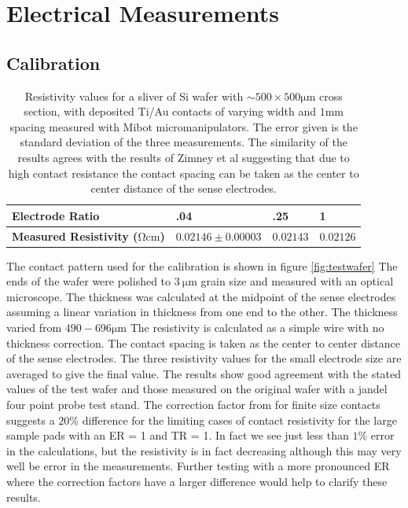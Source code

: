 \FloatBarrier


\section{Electrical Measurements}
\subsection{Calibration }

\begin{table}[!htb]
\begin{center}
\begin{tabular}{ | l | l | l | l |}
\hline
\textbf{Electrode Ratio}&\textbf{.04} & \textbf{.25} & \textbf{1} \\ \hline
\textbf{Measured Resistivity ($\si{\ohm \cm}$)} & $ 0.02146 \pm 0.00003$& $0.02143$&$0.02126 $\\\hline

\end{tabular}
\end{center}
\caption{Resistivity values for a sliver of Si wafer with $\sim 500 \times 500 \si{\micro \meter}$ cross section, with deposited Ti/Au contacts of varying width and $1 \si{\mm}$ spacing measured with Mibot micromanipulators. The error given is the standard deviation of the three measurements. The similarity of the results agrees with the results of Zimney et al \cite{Zimney2007CorrectionStudy} suggesting that due to high contact resistance the contact spacing can be taken as the center to center distance of the sense electrodes.}

\label{Tabcorrection}
\end{table}

The contact pattern used for the calibration is shown in figure \ref{fig:testwafer} The ends of the wafer were polished to $\SI{3}{\micro\meter}$ grain size and measured with an optical microscope. The thickness was calculated at the midpoint of the sense electrodes assuming a linear variation in thickness from one end to the other. The thickness varied from $490 - 696 \si{\micro \meter}$ The resistivity is calculated as a simple wire with no thickness correction. The contact spacing is taken as the center to center distance of the sense electrodes. The three resistivity values for the small electrode size are averaged to give the final value. The results show good agreement with the stated values of the test wafer and those measured on the original wafer with a jandel four point probe test stand.  The correction factor from \cite{Zimney2007CorrectionStudy} for finite size contacts suggests a $20\%$ difference for the limiting cases of contact resistivity for the large sample pads with an ER = 1 and TR = 1. In fact we see just less than $1\%$ error in the calculations, but the resistivity is in fact decreasing although this may very well be error in the measurements. Further testing with a more pronounced ER where the correction factors have a larger difference would help to clarify these results. 


